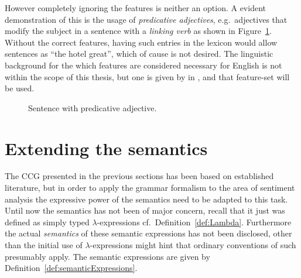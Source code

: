 However completely ignoring the features is neither an option. A evident demonstration of this is the usage of \emph{predicative adjectives}, e.g.\ adjectives that modify the subject in a sentence with a \emph{linking verb} as shown in Figure~\ref{fig:predicateAdj}. Without the correct features, having such entries in the lexicon would allow sentences as ``the hotel great'', which of cause is not desired. The linguistic background for the which features are considered necessary for English is not within the scope of this thesis, but one is given by \citeauthor{juliaThesis} in , and that feature-set will be used.
\begin{figure}[ht]
\center
{}
\caption{Sentence with predicative adjective.}
\label{fig:predicateAdj}
\end{figure}

\section{Extending the semantics}
\label{sec:extendingSemantics}
The CCG presented in the previous sections has been based on established literature, but in order to apply the grammar formalism to the area of sentiment analysis the expressive power of the semantics need to be adapted to this task. Until now the semantics has not been of major concern, recall that it just was defined as simply typed $\lambda$-expressions cf.\ Definition~\ref{def:Lambda}. Furthermore the actual \emph{semantics} of these semantic expressions has not been disclosed, other than the initial use of $\lambda$-expressions might hint that ordinary conventions of such presumably apply. The semantic expressions are given by Definition~\ref{def:semanticExpressions}.

